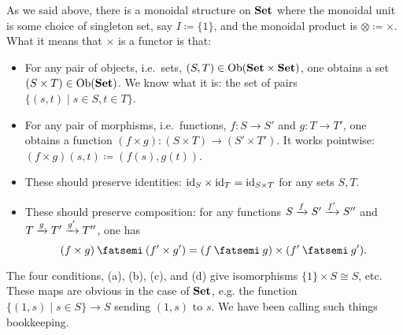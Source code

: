 \documentclass[7Sketches]{subfiles}
\begin{document}
\begin{example}%
\label{ex.set_as_mon_cat}
As we said above, there is a monoidal structure on $\mathbf{Set}$ where the monoidal unit is some choice of singleton set, say $I\coloneqq\{1\}$, and the monoidal product is $\otimes\coloneqq\times$. What it means that $\times$ is a functor is that:
\begin{itemize}
	\item For any pair of objects, i.e.\ sets, $(S,T)\in\operatorname{Ob}(\mathbf{Set}\times\mathbf{Set})$, one obtains a set $(S\times T)\in\operatorname{Ob}(\mathbf{Set})$. We know what it is: the set of pairs $\{(s,t)\mid s\in S, t\in T\}$.
	\item For any pair of morphisms, i.e.\ functions, $f\colon S\to S'$ and $g\colon T\to T'$, one obtains a function $(f\times g)\colon(S\times T)\to (S'\times T')$. It works pointwise: $(f\times g)(s,t)\coloneqq(f(s),g(t))$.
	\item These should preserve identities: $\mathrm{id}_S\times\mathrm{id}_T=\mathrm{id}_{S\times T}$ for any sets $S,T$.
	\item These should preserve composition: for any functions $S\xrightarrow{f}S'\xrightarrow{f'}S''$ and $T\xrightarrow{g}T'\xrightarrow{g'}T''$, one has
	\[
	(f\times g)\cp(f'\times g')=(f\cp g)\times(f'\cp g').
      \]
\end{itemize}

The four conditions, (a), (b), (c), and (d) give isomorphisms $\{1\}\times S\cong S$, etc. These maps are obvious in the case of $\mathbf{Set}$, e.g. the function $\{(1,s)\mid s\in S\}\to S$ sending $(1,s)$ to $s$. We have been calling such things bookkeeping.
\end{example}

\end{document}
